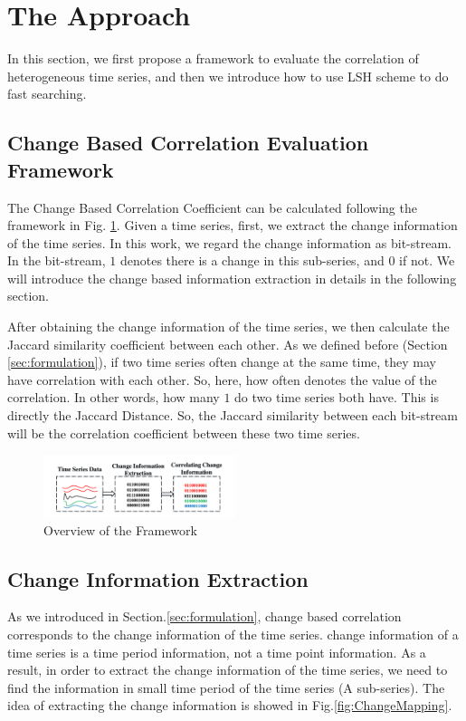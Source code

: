 \section{The Approach}
\label{sec:framework}
In this section, we first propose a framework to evaluate the correlation of heterogeneous time series, and then we introduce how to use LSH scheme to do fast searching.

\subsection{Change Based Correlation Evaluation Framework}

The Change Based Correlation Coefficient can be calculated following the framework in Fig. \ref{fig:frame}.
Given a time series, first, we extract the change information of the time series. 
In this work, we regard the change information as bit-stream. In the bit-stream, $1$ denotes there is a change in this sub-series, and $0$ if not. We will introduce the change based information extraction in details in the following section.

After obtaining the change information of the time series, we then calculate the Jaccard similarity\cite{han2011data} coefficient between each other.
As we defined before (Section \ref{sec:formulation}), if two time series often change at the same time, they may have correlation with each other. 
So, here, how often denotes the value of the correlation. In other words, how many $1$ do two time series both have. This is directly the Jaccard Distance.
So, the Jaccard similarity between each bit-stream will be the correlation coefficient between these two time series. 


\begin{figure}[t]
\centering
\includegraphics[width=0.5\textwidth]{framework.pdf}
\caption{Overview of the Framework}
\label{fig:frame}
\end{figure}

\subsection{Change Information Extraction}
\label{ChangeCorrelation}

As we introduced in Section.\ref{sec:formulation}, change based correlation corresponds to the change information of the time series. change information of a time series is a time period information, not a time point information. 
As a result, in order to extract the change information of the time series, we need to find the information in small time period of the time series (A sub-series). The idea of extracting the change information is showed in Fig.\ref{fig:ChangeMapping}.

